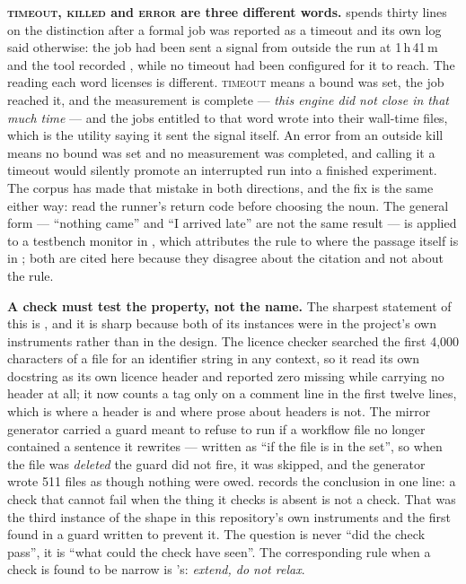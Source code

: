 \textbf{\textsc{timeout}, \textsc{killed} and \textsc{error} are three
different words.}  spends thirty lines on the
distinction after a formal job was reported as a timeout and its own log
said otherwise: the job had been sent a signal from outside the run at
1\,h\,41\,m and the tool recorded , while no
timeout had been configured for it to reach. The reading each word
licenses is different. \textsc{timeout} means a bound was set, the job
reached it, and the measurement is complete --- \emph{this engine did
not close in that much time} --- and the jobs entitled to that word
wrote  into their wall-time files, which is the
 utility saying it sent the signal itself. An error from
an outside kill means no bound was set and no measurement was completed,
and calling it a timeout would silently promote an interrupted run into
a finished experiment. The corpus has made that mistake in both
directions, and the fix is the same either way: read the runner's return
code before choosing the noun. The general form --- ``nothing came''
and ``I arrived late'' are not the same result --- is applied to a
testbench monitor in , which attributes the rule
to  where the passage itself is in ; both are
cited here because they disagree about the citation and not about the
rule.

\begin{sloppypar}
\textbf{A check must test the property, not the name.} The sharpest
statement of this is , and it is sharp because both
of its instances were in the project's own instruments rather than in
the design. The licence checker searched the first 4{,}000 characters of
a file for an identifier string in any context, so it read its own
docstring as its own licence header and reported zero missing while
carrying no header at all; it now counts a tag only on a comment line in
the first twelve lines, which is where a header is and where prose about
headers is not. The mirror generator carried a guard meant to refuse to
run if a workflow file no longer contained a sentence it rewrites ---
written as ``if the file is in the set'', so when the file was
\emph{deleted} the guard did not fire, it was skipped, and the generator
wrote 511 files as though nothing were owed. 
records the conclusion in one line: a check that cannot fail when the
thing it checks is absent is not a check. That was the third instance of
the shape in this repository's own instruments and the first found in a
guard written to prevent it. The question is never ``did the check
pass'', it is ``what could the check have seen''. The corresponding rule
when a check is found to be narrow is 's:
\emph{extend, do not relax}.
\end{sloppypar}


